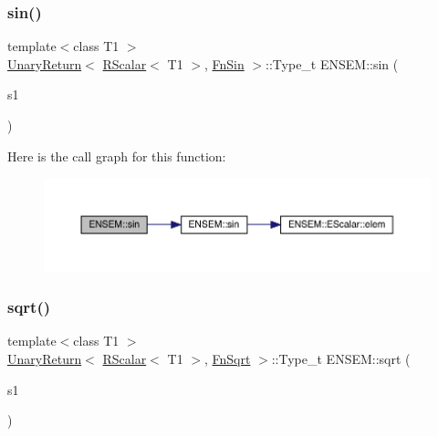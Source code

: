 \subsubsection{\texorpdfstring{sin()}{sin()}}
{\footnotesize\ttfamily template$<$class T1 $>$ \\
\mbox{\hyperlink{structENSEM_1_1UnaryReturn}{Unary\+Return}}$<$ \mbox{\hyperlink{classENSEM_1_1RScalar}{R\+Scalar}}$<$ T1 $>$, \mbox{\hyperlink{structENSEM_1_1FnSin}{Fn\+Sin}} $>$\+::Type\+\_\+t E\+N\+S\+E\+M\+::sin (\begin{DoxyParamCaption}\item[{const \mbox{\hyperlink{classENSEM_1_1RScalar}{R\+Scalar}}$<$ T1 $>$ \&}]{s1 }\end{DoxyParamCaption})\hspace{0.3cm}{\ttfamily [inline]}}

Here is the call graph for this function\+:\nopagebreak
\begin{figure}[H]
\begin{center}
\leavevmode
\includegraphics[width=350pt]{d9/ded/group__rscalar_ga60f574c6e8f0da11360b8c41c46490a5_cgraph}
\end{center}
\end{figure}
\mbox{\label{group__rscalar_ga1f127fac0ef1cb032c7bd632657439bf}} 
\subsubsection{\texorpdfstring{sqrt()}{sqrt()}}
{\footnotesize\ttfamily template$<$class T1 $>$ \\
\mbox{\hyperlink{structENSEM_1_1UnaryReturn}{Unary\+Return}}$<$ \mbox{\hyperlink{classENSEM_1_1RScalar}{R\+Scalar}}$<$ T1 $>$, \mbox{\hyperlink{structENSEM_1_1FnSqrt}{Fn\+Sqrt}} $>$\+::Type\+\_\+t E\+N\+S\+E\+M\+::sqrt (\begin{DoxyParamCaption}\item[{const \mbox{\hyperlink{classENSEM_1_1RScalar}{R\+Scalar}}$<$ T1 $>$ \&}]{s1 }\end{DoxyParamCaption})\hspace{0.3cm}{\ttfamily [inline]}}


